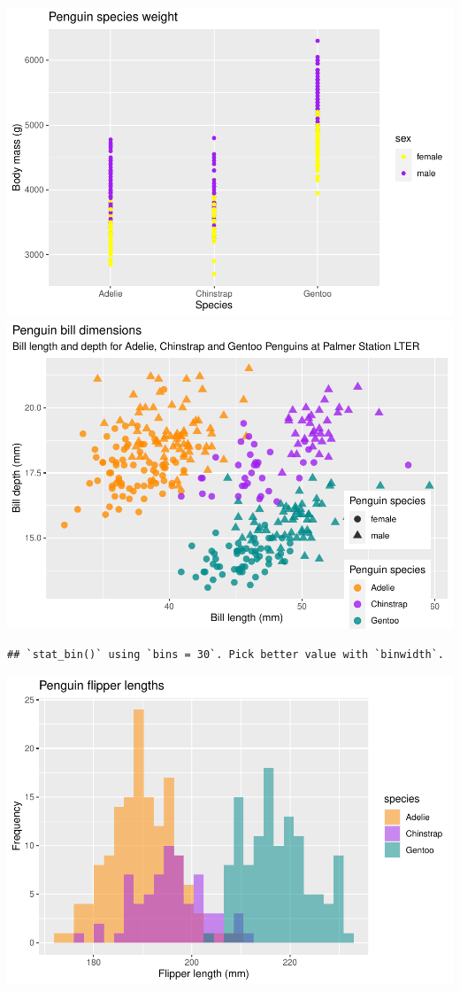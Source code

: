 \documentclass[water,article,submit,moreauthors,pdftex]{mdpi}
\begin{document}
\includegraphics{test_debyo_files/figure-latex/penguin stuff-1.pdf}
\includegraphics{test_debyo_files/figure-latex/penguin stuff-2.pdf}

\begin{verbatim}
## `stat_bin()` using `bins = 30`. Pick better value with `binwidth`.
\end{verbatim}

\includegraphics{test_debyo_files/figure-latex/penguin stuff-3.pdf}
\end{document}
